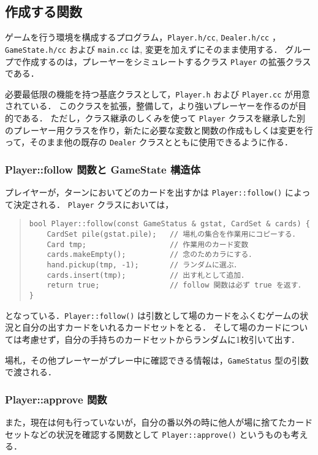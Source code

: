 \subsection{作成する関数}

ゲームを行う環境を構成するプログラム，\verb+Player.h/cc+, \verb+Dealer.h/cc+ ，\verb+GameState.h/cc+ および \verb+main.cc+ は, 変更を加えずにそのまま使用する．
グループで作成するのは，プレーヤーをシミュレートするクラス \verb+Player+ の拡張クラスである．

必要最低限の機能を持つ基底クラスとして，\verb+Player.h+ および \verb+Player.cc+ が用意されている．
このクラスを拡張，整備して，より強いプレーヤーを作るのが目的である．
ただし，クラス継承のしくみを使って \verb+Player+ クラスを継承した別のプレーヤー用クラスを作り，新たに必要な変数と関数の作成もしくは変更を行って，そのまま他の既存の \verb+Dealer+ クラスとともに使用できるように作る．

\subsubsection*{Player::follow 関数と GameState 構造体}
プレイヤーが，ターンにおいてどのカードを出すかは \verb+Player::follow()+ によって決定される．
\verb+Player+ クラスにおいては，
\begin{quote}
\begin{verbatim}
bool Player::follow(const GameStatus & gstat, CardSet & cards) {
    CardSet pile(gstat.pile);   // 場札の集合を作業用にコピーする．
    Card tmp;                   // 作業用のカード変数
    cards.makeEmpty();          // 念のためカラにする．
    hand.pickup(tmp, -1);       // ランダムに選ぶ．
    cards.insert(tmp);          // 出す札として追加．
    return true;                // follow 関数は必ず true を返す．
}
\end{verbatim}
\end{quote}
となっている．\verb+Player::follow()+ は引数として場のカードをふくむゲームの状況と自分の出すカードをいれるカードセットをとる．
そして場のカードについては考慮せず，自分の手持ちのカードセットからランダムに1枚引いて出す．


場札，その他プレーヤーがプレー中に確認できる情報は，\verb+GameStatus+ 型の引数で渡される．

\subsubsection*{Player::approve 関数}
また，現在は何も行っていないが，自分の番以外の時に他人が場に捨てたカードセットなどの状況を確認する関数として \verb+Player::approve()+ というものも考える．
 
